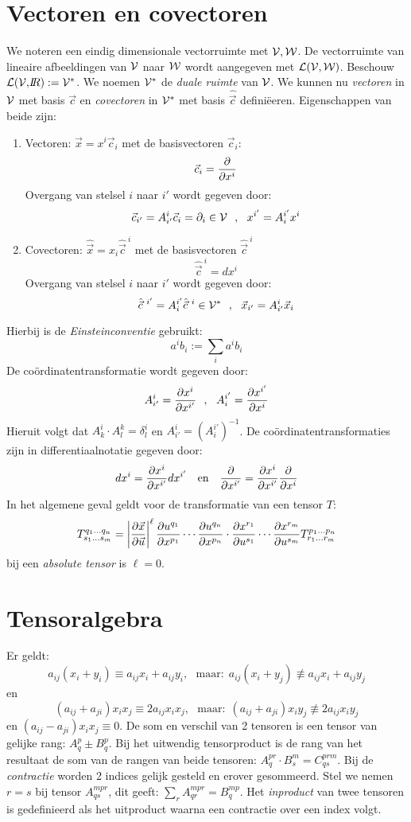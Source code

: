 \section{Vectoren en covectoren}
We noteren een eindig dimensionale vectorruimte met $\cal V, W$. De
vectorruimte van lineaire afbeeldingen van $\cal V$ naar $\cal W$ wordt
aangegeven met $\cal L(V,W)$. Beschouw ${\cal L(V,}I\hspace{-1mm}R):={\cal V}^*$. We
noemen $\cal V^*$ de {\it duale ruimte} van $\cal V$. We kunnen nu
{\it vectoren} in $\cal V$  met basis $\vec{c}$ en {\it covectoren} in 
$\cal V^*$ met basis $\hat{\vec{c}}$ defini\"eeren. Eigenschappen van beide
zijn:
\begin{enumerate}
\item Vectoren: $\vec{x}=x^i\vec{c}_i$ met de basisvectoren $\vec{c}_i$:
      \[
      \vec{c}_i=\frac{\partial }{\partial x^i}
      \]
      Overgang van stelsel $i$ naar $i'$ wordt gegeven door:
      \[
      \vec{c}_{i'}=A_{i'}^i\vec{c}_i=\partial_i\in{\cal V}~~,~~x^{i'}=A_i^{i'}x^i
      \]
\item Covectoren: $\hat{\vec{x}}=x_i\hat{\vec{c}}^{~i}$ met de basisvectoren $\hat{\vec{c}}^{~i}$
      \[
      \hat{\vec{c}}^{~i}=dx^i
      \]
      Overgang van stelsel $i$ naar $i'$ wordt gegeven door:
      \[
      \hat{\vec{c}}^{~i'}=A_i^{i'}\hat{\vec{c}}^{~i}\in{\cal V}^*~~,~~\vec{x}_{i'}=A_{i'}^i\vec{x}_i
      \]
\end{enumerate}
Hierbij is de {\it Einsteinconventie} gebruikt:
\[
a^ib_i:=\sum_ia^ib_i
\]
De co\"ordinatentransformatie wordt gegeven door:
\[
A_{i'}^i=\frac{\partial x^i}{\partial x^{i'}}~~,~~A_i^{i'}=\frac{\partial x^{i'}}{\partial x^i}
\]
Hieruit volgt dat $A_k^i\cdot A_l^k=\delta_l^i$ en $A_{i'}^i=(A_i^{i'})^{-1}$.
\npar
De co\"ordinatentransformaties zijn in differentiaalnotatie gegeven door:
\[
dx^i=\frac{\partial x^i}{\partial x^{i'}}dx^{i'}~~~\mbox{en}~~~\frac{\partial }{\partial x^{i'}}=\frac{\partial x^i}{\partial x^{i'}}\frac{\partial }{\partial x^i}
\]
In het algemene geval geldt voor de transformatie van een tensor $T$:
\[
T_{s_1...s_m}^{q_1...q_n}=\left|\frac{\partial \vec{x}}{\partial \vec{u}}\right|^\ell
\frac{\partial u^{q_1}}{\partial x^{p_1}}\cdots\frac{\partial u^{q_n}}{\partial x^{p_n}}\cdot\frac{\partial x^{r_1}}{\partial u^{s_1}}\cdots\frac{\partial x^{r_m}}{\partial u^{s_m}}T_{r_1...r_m}^{p_1...p_n}
\]
bij een {\it absolute tensor} is $\ell=0$.

\section{Tensoralgebra}
Er geldt:
\[
a_{ij}(x_i+y_i)\equiv a_{ij}x_i+a_{ij}y_i,~~~\mbox{maar:}~~a_{ij}(x_i+y_j)\not\equiv a_{ij}x_i+a_{ij}y_j
\]
en
\[
(a_{ij}+a_{ji})x_ix_j\equiv2a_{ij}x_ix_j,~~~\mbox{maar:}~~(a_{ij}+a_{ji})x_iy_j\not\equiv 2a_{ij}x_iy_j
\]
en $(a_{ij}-a_{ji})x_ix_j\equiv0$.
\npar
De som en verschil van 2 tensoren is een tensor van gelijke rang: $A_q^p\pm
B_q^p$. Bij het uitwendig tensorproduct is de rang van het resultaat de som
van de rangen van beide tensoren: $A_q^{pr}\cdot B_s^m=C_{qs}^{prm}$. Bij de
{\it contractie} worden 2 indices gelijk gesteld en erover gesommeerd. Stel
we nemen $r=s$ bij tensor $A_{qs}^{mpr}$, dit geeft: $\sum\limits_r
A_{qr}^{mpr}=B_q^{mp}$. Het {\it inproduct} van twee tensoren is gedefinieerd
als het uitproduct waarna een contractie over een index volgt.

